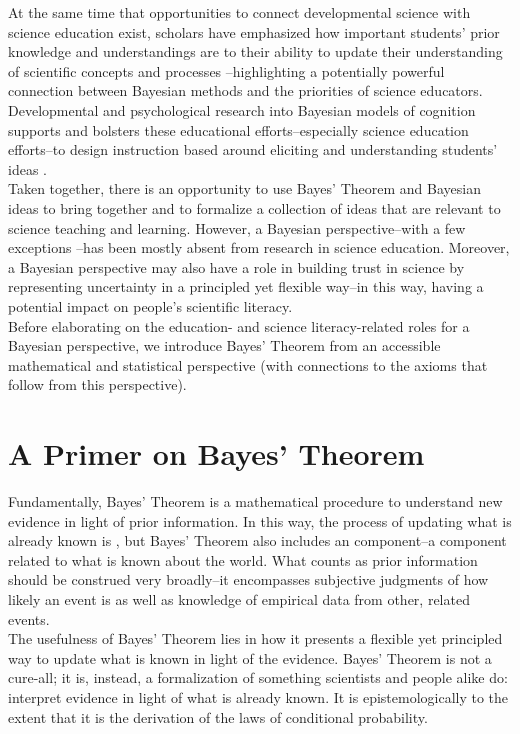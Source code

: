 \documentclass[man, floatsintext]{apa7} %
\begin{document}
At the same time that opportunities to connect developmental science with science education exist, scholars have emphasized how important students' prior knowledge and understandings are to their ability to update their understanding of scientific concepts and processes \parencite[e.g., ][]{ssc07, mkm07, mkk17, ls04}--highlighting a potentially powerful connection between Bayesian methods and the priorities of science educators. Developmental and psychological research into Bayesian models of cognition supports and bolsters these educational efforts--especially science education efforts--to design instruction based around eliciting and understanding students’ ideas \parencite{gb16, hbavb20, wtbs12}. \\

Taken together, there is an opportunity to use Bayes' Theorem and Bayesian ideas to bring together and to formalize a collection of ideas that are relevant to science teaching and learning. However, a Bayesian perspective--with a few exceptions \parencite[e.g., ][]{n11, so12}--has been mostly absent from research in science education. Moreover, a Bayesian perspective may also have a role in building trust in science by representing uncertainty in a principled yet flexible way--in this way, having a potential impact on people's scientific literacy.\\

Before elaborating on the education- and science literacy-related roles for a Bayesian perspective, we introduce Bayes' Theorem from an accessible mathematical and statistical perspective (with connections to the axioms that follow from this perspective).

\section{A Primer on Bayes' Theorem}

Fundamentally, Bayes' Theorem is a mathematical procedure to understand new evidence in light of prior information. In this way, the process of updating what is already known is , but Bayes' Theorem also includes an  component--a component related to what is known about the world. What counts as prior information should be construed very broadly--it encompasses subjective judgments of how likely an event is as well as knowledge of empirical data from other, related events. \\

The usefulness of Bayes' Theorem lies in how it presents a flexible yet principled way to update what is known in light of the evidence. Bayes' Theorem is not a cure-all; it is, instead, a formalization of something scientists and people alike do: interpret evidence in light of what is already known. It is epistemologically  to the extent that it is the derivation of the laws of conditional probability. \\
\end{document}
